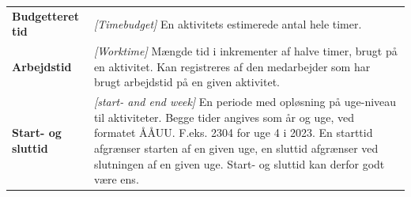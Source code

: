 \begin{table}[H]
\begin{tabular}{>{\bfseries}l p{}}
        Budgetteret tid & \textit{[Timebudget]} En aktivitets estimerede antal hele timer. \\
        
        Arbejdstid & \textit{[Worktime]} Mængde tid i inkrementer af halve timer, brugt på en aktivitet. Kan registreres af den medarbejder som har brugt arbejdstid på en given aktivitet. \\
        
        Start- og sluttid & \textit{[start- and end week]} En periode med opløsning på uge-niveau til aktiviteter. Begge tider angives som år og uge, ved formatet ÅÅUU. F.eks. 2304 for uge 4 i 2023. En starttid afgrænser starten af en given uge, en sluttid afgrænser ved slutningen af en given uge. Start- og sluttid kan derfor godt være ens.
        \end{tabular}
\end{table}

